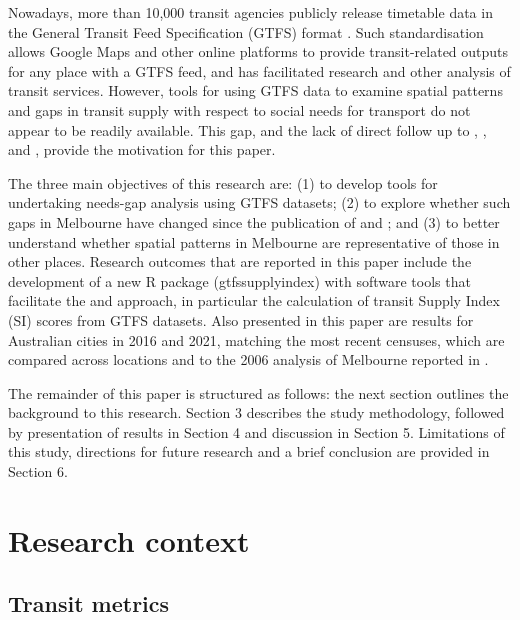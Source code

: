 \documentclass[preprint, 3p,
authoryear]{elsarticle} %
\begin{document}
Nowadays, more than 10,000 transit agencies publicly release timetable
data in the General Transit Feed Specification (GTFS) format
\citep{GTFS}. Such standardisation allows Google Maps and other online
platforms to provide transit-related outputs for any place with a GTFS
feed, and has facilitated research and other analysis of transit
services. However, tools for using GTFS data to examine spatial patterns
and gaps in transit supply with respect to social needs for transport do
not appear to be readily available. This gap, and the lack of direct
follow up to \citet{Currie2003Hobart}, \citet{Currie2004Gap},
\citet{Currie2007Identifying} and \citet{currie2010identifying}, provide
the motivation for this paper.

The three main objectives of this research are: (1) to develop tools for
undertaking needs-gap analysis using GTFS datasets; (2) to explore
whether such gaps in Melbourne have changed since the publication of
\citet{Currie2007Identifying} and \citet{currie2010identifying}; and (3)
to better understand whether spatial patterns in Melbourne are
representative of those in other places. Research outcomes that are
reported in this paper include the development of a new R package
(gtfssupplyindex) with software tools that facilitate the
\citet{Currie2007Identifying} and \citet{currie2010identifying}
approach, in particular the calculation of transit Supply Index (SI)
scores from GTFS datasets. Also presented in this paper are results for
Australian cities in 2016 and 2021, matching the most recent censuses,
which are compared across locations and to the 2006 analysis of
Melbourne reported in \citet{currie2010identifying}.

The remainder of this paper is structured as follows: the next section
outlines the background to this research. Section 3 describes the study
methodology, followed by presentation of results in Section 4 and
discussion in Section 5. Limitations of this study, directions for
future research and a brief conclusion are provided in Section 6.

\hypertarget{research-context}{%
\section{Research context}\label{research-context}}

\hypertarget{transit-metrics}{%
\subsection{Transit metrics}\label{transit-metrics}}
\end{document}
